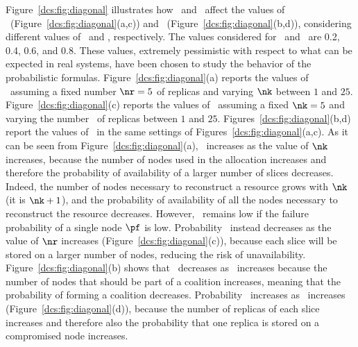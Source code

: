 {Figure~\ref{dcs:fig:diagonal} illustrates how \nk\ and \nr\ affect the
values of \PF\ (Figure~\ref{dcs:fig:diagonal}(a,c)) and
\PC\ (Figure~\ref{dcs:fig:diagonal}(b,d)), considering different values of
\pf\ and \pc, respectively. The values considered for \pf\ and
\pc\ are 0.2, 0.4, 0.6, and 0.8. These values, extremely pessimistic
with respect to what can be expected in real systems, have been chosen
to study the behavior of the probabilistic formulas.
Figure~\ref{dcs:fig:diagonal}(a) reports the values of \PF\ assuming a
fixed number $\nr=5$ of replicas and varying $\nk$ between $1$ and
$25$.  Figure~\ref{dcs:fig:diagonal}(c) reports the values of
\PF\ assuming a fixed $\nk=5$ and varying the number \nr\ of replicas
between $1$ and $25$.  Figures~\ref{dcs:fig:diagonal}(b,d) report the
values of \PC\ in the same settings of
Figures~\ref{dcs:fig:diagonal}(a,c). As it can be seen from
Figure~\ref{dcs:fig:diagonal}(a), \PF\ increases as the value of $\nk$
increases, because the number of nodes used in the allocation
increases and therefore the probability of availability of a larger
number of slices decreases.  Indeed, the number of nodes necessary to
reconstruct a resource grows with $\nk$ (it is $\nk+1$), and the
probability of availability of all the nodes necessary to reconstruct
the resource decreases.  However, \PF\ remains low if the failure
probability of a single node $\pf$ is low. Probability \PF\ instead
decreases as the value of $\nr$ increases
(Figure~\ref{dcs:fig:diagonal}(c)), because each slice will be stored on a
larger number of nodes, reducing the risk of unavailability.
Figure~\ref{dcs:fig:diagonal}(b) shows that \PC\ decreases as
\nk\ increases because the number of nodes that should be part of a
coalition increases, meaning that the probability of forming a
coalition decreases. Probability \PC\ increases as \nr\ increases
(Figure~\ref{dcs:fig:diagonal}(d)), because the number of replicas of each
slice increases and therefore also the probability that one replica is
stored on a compromised node increases.


}
